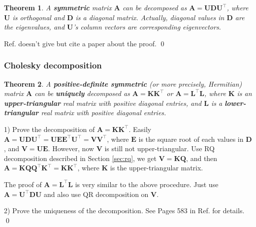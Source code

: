 \documentclass[12pt]{article}
\newtheorem{theorem}{Theorem}[section]
\numberwithin{equation}{section}
\renewenvironment{proof}{{\bfseries Proof.}}{\qed \\}
\begin{document}
\begin{theorem}
A \textbf{symmetric} matrix $\mathbf{A}$ can be decomposed as $\mathbf{A} = \mathbf{U}\mathbf{D}\mathbf{U}^\top$, where $\mathbf{U}$ is orthogonal and $\mathbf{D}$ is a diagonal matrix. Actually,  diagonal values in $\mathbf{D}$ are the eigenvalues, and $\mathbf{U}$'s column vectors are corresponding eigenvectors.
\label{theorem:eigen_decomp}
\end{theorem}

\begin{proof}
Ref. \citep{hartley2003multiple} doesn't give but cite a paper about the proof.
\end{proof}

\subsubsection{Cholesky decomposition}
\label{sec:cholesky}

\begin{theorem}
A \textbf{positive-definite symmetric} (or more precisely, Hermitian) matrix $\mathbf{A}$ can be \textbf{uniquely} decomposed as $\mathbf{A} = \mathbf{KK}^\top$ or $\mathbf{A} = \mathbf{L}^\top\mathbf{L}$, where $\mathbf{K}$ is an \textbf{upper-triangular} real matrix with positive diagonal entries, and $\mathbf{L}$ is a \textbf{lower-triangular} real matrix with positive diagonal entries.
\end{theorem}

\begin{proof}

1) Prove the decomposition of $\mathbf{A} = \mathbf{KK}^\top$. Easily $\mathbf{A} =  \mathbf{U}\mathbf{D}\mathbf{U}^\top =  \mathbf{U}\mathbf{E}\mathbf{E}^\top\mathbf{U}^\top = \mathbf{V}\mathbf{V}^\top$, where $\mathbf{E}$ is the square root of each values in $\mathbf{D}$, and $\mathbf{V} = \mathbf{UE}$. However, now $\mathbf{V}$ is still not upper-triangular. Use RQ decomposition described in Section \ref{sec:rq}, we get $\mathbf{V} = \mathbf{KQ}$, and then $\mathbf{A} = \mathbf{KQ}\mathbf{Q}^\top\mathbf{K}^\top = \mathbf{K}\mathbf{K}^\top$, where $\mathbf{K}$ is the upper-triangular matrix.

The proof of $\mathbf{A} = \mathbf{L}^\top\mathbf{L}$ is very similar to the above procedure. Just use $\mathbf{A} =  \mathbf{U}^\top\mathbf{D}\mathbf{U}$ and also use QR decomposition on $\mathbf{V}$.

2) Prove the uniqueness of the decomposition. See Pages 583 in Ref. \cite{hartley2003multiple} for details.
\end{proof}
\end{document}
